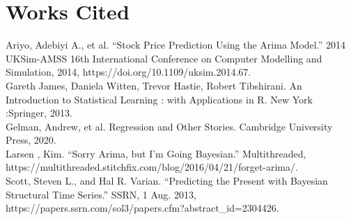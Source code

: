 \documentclass{article}
\begin{document}
\section{Works Cited}

\noindent Ariyo, Adebiyi A., et al. “Stock Price Prediction Using the Arima Model.” 2014 UKSim-AMSS 16th International Conference on Computer Modelling and Simulation, 2014, https://doi.org/10.1109/uksim.2014.67.\\

\noindent Gareth James, Daniela Witten, Trevor Hastie, Robert Tibshirani. An Introduction to Statistical Learning : with Applications in R. New York :Springer, 2013.\\

\noindent Gelman, Andrew, et al. Regression and Other Stories. Cambridge University Press, 2020.\\

\noindent Larsen , Kim. “Sorry Arima, but I'm Going Bayesian.” Multithreaded, \\
\noindent https://multithreaded.stitchfix.com/blog/2016/04/21/forget-arima/.\\

\noindent Scott, Steven L., and Hal R. Varian. “Predicting the Present with Bayesian Structural Time Series.” SSRN, 1 Aug. 2013, https://papers.ssrn.com/sol3/papers.cfm?abstract\_id=2304426.
\end{document}
